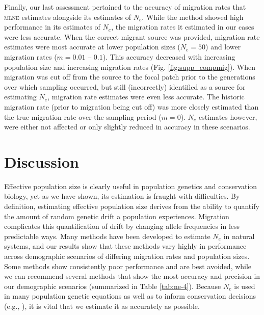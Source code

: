 Finally, our last assessment pertained to the accuracy of migration rates that \textsc{mlne} estimates 
alongside its estimates of $N_e$. While the method showed high performance in its estimates of 
$N_e$, the migration rates it estimated in our cases were less accurate. When the correct migrant 
source was provided, migration rate estimates were most accurate at lower population sizes ($N_e = 50$) 
and lower migration rates ($m = 0.01$ -- $0.1$). This accuracy decreased with increasing population size 
and increasing migration rates (Fig. \ref{fig:supp_compmig}). When migration was cut off from the source to the focal patch 
prior to the generations over which sampling occurred, but still (incorrectly) identified as a source for 
estimating $N_e$, migration rate estimates were even less accurate. The historic migration rate 
(prior to migration being cut off) was more closely estimated than the true migration rate over the 
sampling period ($m = 0$). $N_e$ estimates however, were either not affected or only slightly 
reduced in accuracy in these scenarios.

\section{Discussion}
Effective population size is clearly useful in population genetics and conservation biology, yet as 
we have shown, its estimation is fraught with difficulties. By definition, estimating effective 
population size derives from the ability to quantify the amount of random genetic drift a population 
experiences. Migration complicates this quantification of drift by changing allele frequencies in 
less predictable ways. Many methods have been developed to estimate $N_e$ in natural 
systems, and our results show that these methods vary highly in performance across demographic scenarios 
of differing migration rates and population sizes. Some methods show consistently poor performance and 
are best avoided, while we can recommend several methods that show the most accuracy and precision in 
our demographic scenarios (summarized in Table \ref{tab:ne-4}). Because $N_e$ is used in many population 
genetic equations as well as to inform conservation decisions (e.g., \citealt{Shaffer:1981, Rieman:2001}), it 
is vital that we estimate it as accurately as possible.

